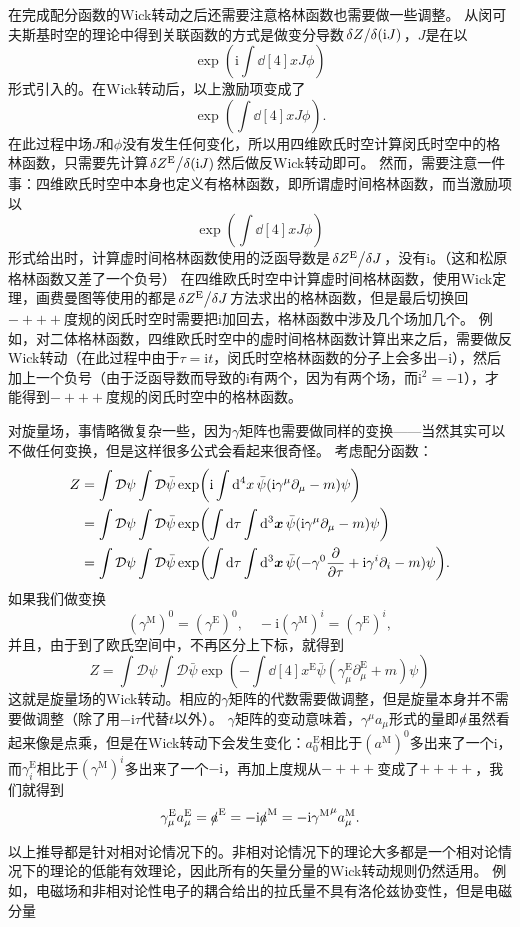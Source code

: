 \documentclass[hyperref, UTF8, a4paper]{ctexart}
\newcommand*{\ii}{\mathrm{i}}
\newcommand*{\fd}[1]{\mathcal{D} #1}
\begin{document}
在完成配分函数的Wick转动之后还需要注意格林函数也需要做一些调整。
从闵可夫斯基时空的理论中得到关联函数的方式是做变分导数$\fdv*{Z}{(\ii J)}$，$J$是在以
\[
    \exp(\ii \int \dd[4]{x} J \phi)
\]
形式引入的。在Wick转动后，以上激励项变成了
\[
    \exp(\int \dd[4]{x} J \phi).
\]
在此过程中场$J$和$\phi$没有发生任何变化，所以用四维欧氏时空计算闵氏时空中的格林函数，只需要先计算$\fdv*{Z^\text{E}}{(\ii J)}$然后做反Wick转动即可。
然而，需要注意一件事：四维欧氏时空中本身也定义有格林函数，即所谓虚时间格林函数，而当激励项以
\[
    \exp(\int \dd[4]{x} J \phi)
\]
形式给出时，计算虚时间格林函数使用的泛函导数是$\fdv*{Z^\text{E}}{J}$，没有$\ii$。（这和松原格林函数又差了一个负号）
在四维欧氏时空中计算虚时间格林函数，使用Wick定理，画费曼图等使用的都是$\fdv*{Z^\text{E}}{J}$方法求出的格林函数，但是最后切换回$-+++$度规的闵氏时空时需要把$\ii$加回去，格林函数中涉及几个场加几个。
例如，对二体格林函数，四维欧氏时空中的虚时间格林函数计算出来之后，需要做反Wick转动（在此过程中由于$\tau = \ii t$，闵氏时空格林函数的分子上会多出$-\ii$），然后加上一个负号（由于泛函导数而导致的$\ii$有两个，因为有两个场，而$\ii^2=-1$），才能得到$-+++$度规的闵氏时空中的格林函数。

对旋量场，事情略微复杂一些，因为$\gamma$矩阵也需要做同样的变换——当然其实可以不做任何变换，但是这样很多公式会看起来很奇怪。
考虑配分函数：
\[
    \begin{aligned}
        Z &= \int \fd{\psi} \int \fd{\bar{\psi}} \exp(\ii \int \dd[4]{x} \bar{\psi} (\ii \gamma^\mu \partial_\mu - m) \psi) \\
        &= \int \fd{\psi} \int \fd{\bar{\psi}} \exp(\int \dd{\tau} \int \dd[3]{\vb*{x}} \bar{\psi} (\ii \gamma^\mu \partial_\mu - m) \psi) \\
        &= \int \fd{\psi} \int \fd{\bar{\psi}} \exp(\int \dd{\tau} \int \dd[3]{\vb*{x}} \bar{\psi} (- \gamma^0 \pdv{\tau} + \ii \gamma^i \partial_i - m) \psi).
    \end{aligned}
\]
如果我们做变换
\begin{equation}
    (\gamma^\text{M})^0 = (\gamma^\text{E})^0, \quad - \ii (\gamma^\text{M})^i = (\gamma^\text{E})^i,
\end{equation}
并且，由于到了欧氏空间中，不再区分上下标，就得到
\begin{equation}
    Z = \int \fd{\psi} \int \fd{\bar{\psi}} \exp(- \int \dd[4]{x^\text{E}} \bar{\psi} (\gamma^\text{E}_\mu \partial_\mu^\text{E} + m) \psi)
\end{equation}
这就是旋量场的Wick转动。相应的$\gamma$矩阵的代数需要做调整，但是旋量本身并不需要做调整（除了用$-\ii \tau$代替$t$以外）。
$\gamma$矩阵的变动意味着，$\gamma^\mu a_\mu$形式的量即$\slashed{a}$虽然看起来像是点乘，但是在Wick转动下会发生变化：$a_0^\text{E}$相比于$(a^\text{M})^0$多出来了一个$\ii$，而$\gamma_i^\text{E}$相比于$(\gamma^\text{M})^i$多出来了一个$-\ii$，再加上度规从$-+++$变成了$++++$，我们就得到
\begin{equation}
    \gamma^\text{E}_\mu a^\text{E}_\mu = \slashed{a}^\text{E} = - \ii \slashed{a}^\text{M} = -\ii {\gamma^\text{M}}^\mu a^\text{M}_\mu.
\end{equation}

以上推导都是针对相对论情况下的。非相对论情况下的理论大多都是一个相对论情况下的理论的低能有效理论，因此所有的矢量分量的Wick转动规则仍然适用。
例如，电磁场和非相对论性电子的耦合给出的拉氏量不具有洛伦兹协变性，但是电磁分量
\end{document}
